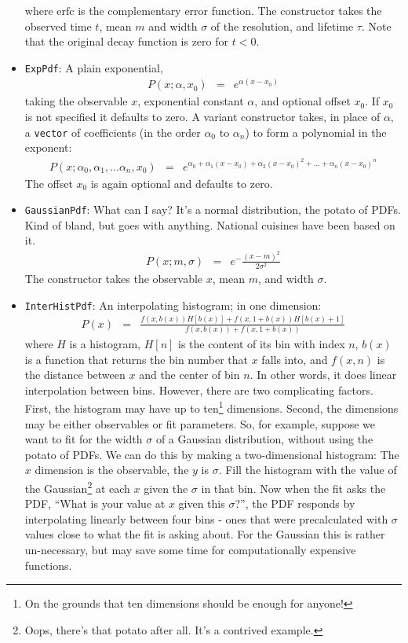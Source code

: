 \documentclass[12pt,pdflatex]{article}
\begin{document}
\begin{itemize}
where $\mathrm{erfc}$ is the complementary error function. The constructor
takes the observed time $t$, mean $m$ and width $\sigma$ of the resolution,
and lifetime $\tau$. Note that the original decay function is zero for $t<0$. 
\item \texttt{ExpPdf}: A plain exponential,
\begin{eqnarray}
P(x;\alpha, x_0) &=& e^{\alpha(x-x_0)}
\end{eqnarray}
taking the observable $x$, exponential constant $\alpha$, and optional offset $x_0$.
If $x_0$ is not specified it defaults to zero. A variant constructor takes, in place
of $\alpha$, a \texttt{vector} of coefficients (in the order $\alpha_0$ to $\alpha_n$) 
to form a polynomial in the exponent:
\begin{eqnarray}
P(x;\alpha_0, \alpha_1, \ldots \alpha_n, x_0) &=& e^{\alpha_0 + \alpha_1(x-x_0) + \alpha_2(x-x_0)^2 + \ldots + \alpha_n(x-x_0)^n}
\end{eqnarray}
The offset $x_0$ is again optional and defaults to zero. 
\item \texttt{GaussianPdf}: What can I say? It's a normal distribution, the potato
of PDFs. Kind of bland, but goes with anything. National cuisines have been based on it.  
\begin{eqnarray}
P(x;m,\sigma) &=& e^-\frac{(x-m)^2}{2\sigma^2}
\end{eqnarray}
The constructor takes the observable $x$, mean $m$, and width $\sigma$. 
\item \texttt{InterHistPdf}: An interpolating histogram; in one dimension:
\begin{eqnarray}
P(x) &=& \frac{f(x, b(x))H[b(x)] + f(x, 1 + b(x))H[b(x) + 1]}{f(x, b(x)) + f(x, 1 + b(x))}
\end{eqnarray}
where $H$ is a histogram, $H[n]$ is the content of its bin with index $n$, 
$b(x)$ is a function that returns the bin number that $x$ falls into,
and $f(x, n)$ is the distance between $x$ and the center of bin $n$. 
In other words, it does linear interpolation between bins. However,
there are two complicating factors. First, the histogram may have
up to ten\footnote{On the grounds that ten dimensions should be enough for anyone!} dimensions.
Second, the dimensions may be either observables or fit parameters. 
So, for example, suppose we want to fit for the width $\sigma$ of a Gaussian
distribution, without using the potato of PDFs. We can do this by making
a two-dimensional histogram: The $x$ dimension is the observable, the $y$
is $\sigma$. Fill the histogram with the value of the Gaussian\footnote{Oops, there's
that potato after all. It's a contrived example.} at each $x$ given the $\sigma$
in that bin. Now when the fit asks the PDF, ``What is your value at $x$ given this $\sigma$?'',
the PDF responds by interpolating linearly between four bins - ones that were precalculated
with $\sigma$ values close to what the fit is asking about. For the Gaussian this is
rather un-necessary, but may save some time for computationally expensive functions. 


\end{itemize}
\end{document}

